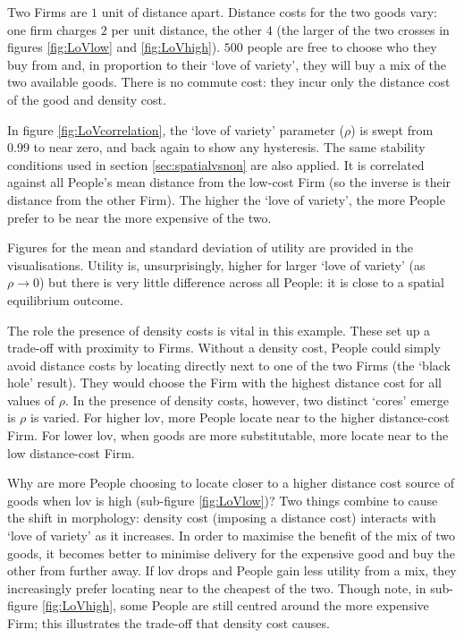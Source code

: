 Two Firms are $1$ unit of distance apart. Distance costs for the two goods vary: one firm charges $2$ per unit distance, the other $4$ (the larger of the two crosses in figures \ref{fig:LoVlow} and \ref{fig:LoVhigh}). $500$ people are free to choose who they buy from and, in proportion to their `love of variety', they will buy a mix of the two available goods. There is no commute cost: they incur only the distance cost of the good and density cost.

In figure \ref{fig:LoVcorrelation}, the `love of variety' parameter ($\rho$) is swept from 0.99 to near zero, and back again to show any hysteresis. The same stability conditions used in section \ref{sec:spatialvsnon} are also applied. It is correlated against all People's mean distance from the low-cost Firm (so the inverse is their distance from the other Firm). The higher the `love of variety', the more People prefer to be near the more expensive of the two.

Figures for the mean and standard deviation of utility are provided in the visualisations. Utility is, unsurprisingly, higher for larger `love of variety' (as $\rho \rightarrow 0$) but there is very little difference across all People: it is close to a spatial equilibrium outcome. 

The role the presence of density costs is vital in this example. These set up a trade-off with proximity to Firms. Without a density cost, People could simply avoid distance costs by locating directly next to one of the two Firms (the `black hole' result). They would choose the Firm with the highest distance cost for all values of $\rho$. In the presence of density costs, however, two distinct `cores' emerge is $\rho$ is varied. For higher \gls{lov}, more People locate near to the higher distance-cost Firm. For lower \gls{lov}, when goods are more substitutable, more locate near to the low distance-cost Firm.

Why are more People choosing to locate closer to a higher distance cost source of goods when \gls{lov} is high (sub-figure \ref{fig:LoVlow})? Two things combine to cause the shift in morphology: density cost (imposing a distance cost) interacts with `love of variety' as it increases. In order to maximise the benefit of the mix of two goods, it becomes better to minimise delivery for the expensive good and buy the other from further away. If \gls{lov} drops and People gain less utility from a mix, they increasingly prefer locating near to the cheapest of the two. Though note, in sub-figure \ref{fig:LoVhigh}, some People are still centred around the more expensive Firm; this illustrates the trade-off that density cost causes.

